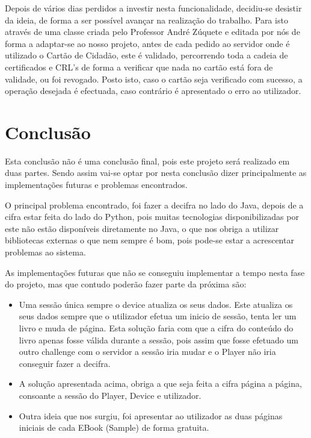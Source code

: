 \documentclass[pdftex,12pt,a4paper]{report}
\begin{document}
Depois de vários dias perdidos a investir nesta funcionalidade, decidiu-se desistir da ideia, de forma a ser possível avançar na realização do trabalho. Para isto através de uma classe criada pelo Professor André Zúquete e editada por nós de forma a adaptar-se ao nosso projeto, antes de cada pedido ao servidor onde é utilizado o Cartão de Cidadão, este é validado, percorrendo toda a cadeia de certificados e CRL’s de forma a verificar que nada no cartão está fora de validade, ou foi revogado.
Posto isto, caso o cartão seja verificado com sucesso, a operação desejada é efectuada, caso contrário é apresentado o erro ao utilizador.

\newpage
\section{Conclusão}

Esta conclusão não é uma conclusão final, pois este projeto será realizado em duas partes.
Sendo assim vai-se optar por nesta conclusão dizer principalmente as implementações futuras e problemas encontrados.

O principal problema encontrado, foi fazer a decifra no lado do Java, depois de a cifra estar feita do lado do Python, pois muitas tecnologias disponibilizadas por este não estão disponíveis diretamente no Java, o que nos obriga a utilizar bibliotecas externas o que nem sempre é bom, pois pode-se estar a acrescentar problemas ao sistema. 

As implementações futuras que não se conseguiu implementar a tempo nesta fase do projeto, mas que contudo poderão fazer parte da próxima são:
\begin{itemize}
\item Uma sessão única sempre o device atualiza os seus dados. Este atualiza os seus dados sempre que o utilizador efetua um inicio de sessão, tenta ler um livro e muda de página. Esta solução faria com que a cifra do conteúdo do livro apenas fosse válida durante a sessão, pois assim que fosse efetuado um outro challenge com o servidor a sessão iria mudar e o Player não iria conseguir fazer a decifra.
\item A solução apresentada acima, obriga a que seja feita a cifra página a página, consoante a sessão do Player, Device e utilizador.
\item Outra ideia que nos surgiu, foi apresentar ao utilizador as duas páginas iniciais de cada EBook (Sample) de forma gratuita.
\end{itemize}
\end{document}
